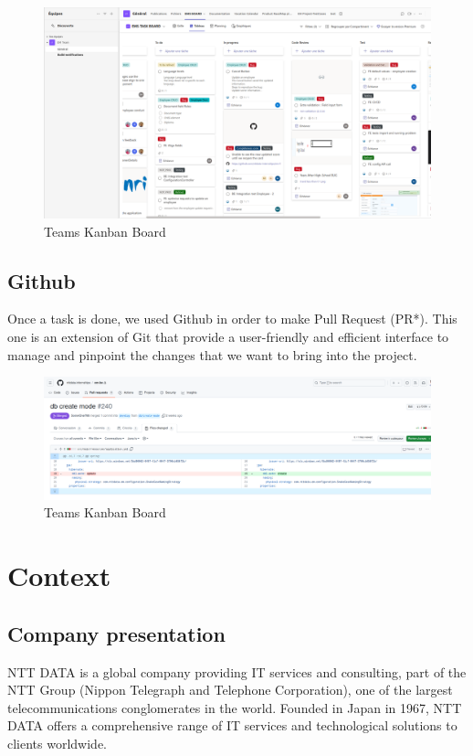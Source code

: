 \documentclass[12pt,a4paper,table,english]{article}
\begin{document}
	\begin{figure}[h!]
		\centering
		\includegraphics[width=0.8\linewidth]{Image/teams}
		\caption{Teams Kanban Board}
		\label{fig:Teams Kanban Board}
	\end{figure}
	
	\subsection{Github}
	
	Once a task is done, we used Github in order to make Pull Request (PR*). This one is an extension of Git that provide a user-friendly and efficient interface to manage and pinpoint the changes that we want to bring into the project.
	
	\begin{figure}[h!]
		\centering
		\includegraphics[width=0.8\linewidth]{Image/github}
		\caption{Teams Kanban Board}
		\label{fig:Teams Kanban Board}
	\end{figure}
	\pagebreak
	
	
	\section{Context}

	\subsection{Company presentation}
	
	NTT DATA is a global company providing IT services and consulting, part of the NTT Group (Nippon Telegraph and Telephone Corporation), one of the largest telecommunications conglomerates in the world. Founded in Japan in 1967, NTT DATA offers a comprehensive range of IT services and technological solutions to clients worldwide.\\
	
\end{document}
